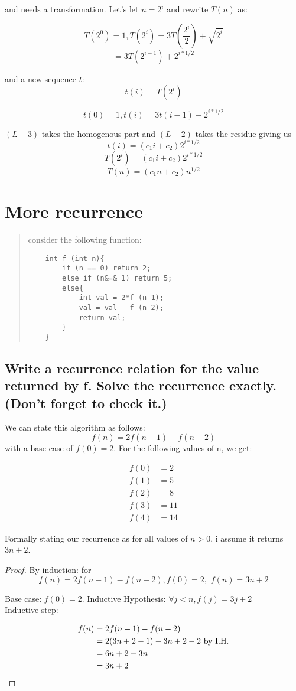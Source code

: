 \documentclass[titlepage]{article}\usepackage[]{graphicx}\usepackage[]{color}
\begin{document}

and needs a transformation. Let's  let $n = 2^i$ and rewrite $T(n)$ as:

\[ T(2^0) = 1, T(2^i) = 3T(\frac{2^i}{2}) + \sqrt{2^i} \]
\[ = 3T(2^{i-1}) + 2^{i*1/2} \]

and a new sequence $t$:
\[ t(i) = T(2^i) \]

\[ t(0) = 1, t(i) = 3t(i-1) + 2^{i*1/2} \]

$(L - 3)$ takes the homogenous part and $(L-2)$ takes the residue
giving us 
\[ t(i) = (c_1 i + c_2) 2^{i*1/2} \]
\[ T(2^i) = (c_1 i + c_2) 2^{i*1/2} \]
\[ T(n) = (c_1 n + c_2) n^{1/2} \]


\section{More recurrence}

\begin{quote}
consider the following function:
\begin{lstlisting}
	int f (int n){
		if (n == 0) return 2;
		else if (n&=& 1) return 5;
		else{
			int val = 2*f (n-1);
			val = val - f (n-2);
			return val;
		}
	}
\end{lstlisting}
\end{quote}

\subsection{Write a recurrence relation for the value returned by f. Solve the
recurrence exactly. (Don't forget to check it.)}
We can state this algorithm as follows:
\[ f(n) = 2f(n-1) - f(n-2) \]
with a base case of $f(0) = 2$. For the following values of n, we get:

\begin{align}
	f(0) &= 2 \\
	f(1) &= 5 \\
	f(2) &= 8 \\
	f(3) &= 11 \\
	f(4) &= 14
	\label{eqn:something}
\end{align}

Formally stating our recurrence as 
for all values of $n > 0$,  i assume it returns $3n+2$. 
\begin{proof} By induction: for 
\[ f(n) = 2f(n-1) - f(n-2) , f(0) = 2,\,\, f(n) = 3n +2 \]

Base case: $f(0) = 2$.  
Inductive Hypothesis: $\forall j < n, f(j) = 3j + 2 $ \\
Inductive step: 

\begin{align*}
	f(n) &= 2f(n-1) - f(n-2) \\
	&= 2(3n + 2 -1) - 3n+2-2 \text{ by I.H.} \\
	&= 6n + 2 - 3n \\
	&= 3n + 2 \qedhere
\end{align*}
\end{proof}
\end{document}
